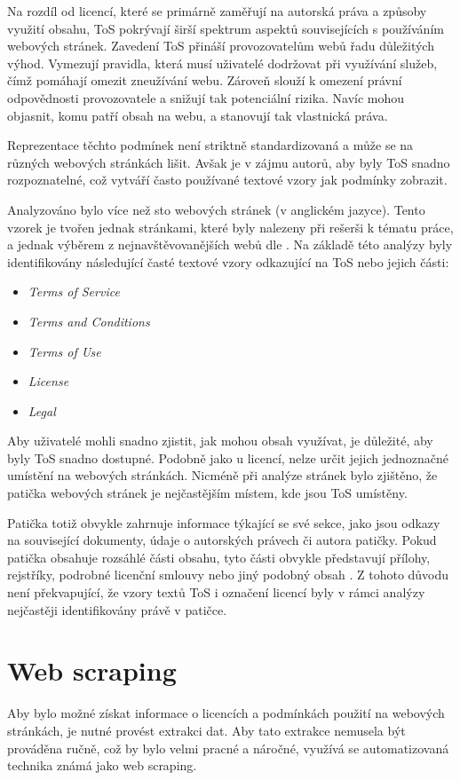 Na rozdíl od licencí, které se primárně zaměřují na autorská práva a způsoby využití obsahu, ToS pokrývají širší spektrum aspektů souvisejících s používáním webových stránek.
Zavedení ToS přináší provozovatelům webů řadu důležitých výhod.
Vymezují pravidla, která musí uživatelé dodržovat při využívání služeb, čímž pomáhají omezit zneužívání webu.
Zároveň slouží k omezení právní odpovědnosti provozovatele a snižují tak potenciální rizika.
Navíc mohou objasnit, komu patří obsah na webu, a stanovují tak vlastnická práva.

Reprezentace těchto podmínek není striktně standardizovaná a může se na různých webových stránkách lišit.
Avšak je v zájmu autorů, aby byly ToS snadno rozpoznatelné, což vytváří často používané textové vzory jak podmínky zobrazit.

\clearpage
Analyzováno bylo více než sto webových stránek (v anglickém jazyce).
Tento vzorek je tvořen jednak stránkami, které byly nalezeny při rešerši k tématu práce, a jednak výběrem z nejnavštěvovanějších webů dle \cite{dataforseo1000Websites}.
Na základě této analýzy byly identifikovány následující časté textové vzory odkazující na ToS nebo jejich části:\begin{itemize}
    \item \textit{Terms of Service}
    \item \textit{Terms and Conditions}
    \item \textit{Terms of Use}
    \item \textit{License}
    \item \textit{Legal}
\end{itemize}

Aby uživatelé mohli snadno zjistit, jak mohou obsah využívat, je důležité, aby byly ToS snadno dostupné.
Podobně jako u licencí, nelze určit jejich jednoznačné umístění na webových stránkách.
Nicméně při analýze stránek bylo zjištěno, že patička webových stránek je nejčastějším místem, kde jsou ToS umístěny.

Patička totiž obvykle zahrnuje informace týkající se své sekce, jako jsou odkazy na související dokumenty, údaje o autorských právech či autora patičky.
Pokud patička obsahuje rozsáhlé části obsahu, tyto části obvykle představují přílohy, rejstříky, podrobné licenční smlouvy nebo jiný podobný obsah \cite{w3449Footer}.
Z tohoto důvodu není překvapující, že vzory textů ToS i označení licencí byly v rámci analýzy nejčastěji identifikovány právě v patičce.

\section{Web scraping}
Aby bylo možné získat informace o licencích a podmínkách použití na webových stránkách, je nutné provést extrakci dat.
Aby tato extrakce nemusela být prováděna ručně, což by bylo velmi pracné a náročné, využívá se automatizovaná technika známá jako web scraping.

